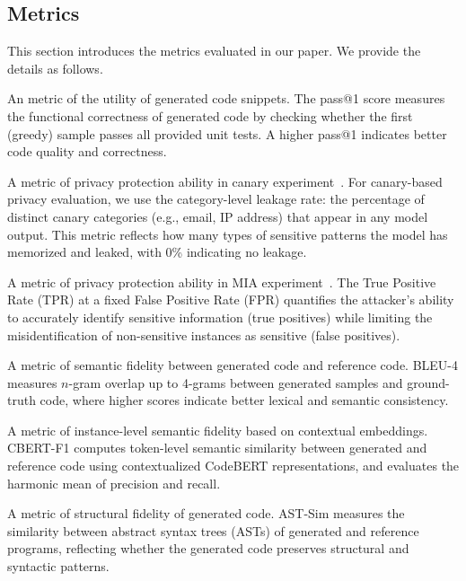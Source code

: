 \documentclass{article}
\theoremstyle{plain}
\theoremstyle{definition}
\theoremstyle{remark}
\begin{document}
{\subsection{Metrics}
\label{app:metrics}

This section introduces the metrics evaluated in our paper. We provide the details as follows.

 An metric of the utility of generated code snippets. The pass@1 score measures the functional correctness of generated code by checking whether the first (greedy) sample passes all provided unit tests. A higher pass@1 indicates better code quality and correctness.

 A metric of privacy protection ability in canary experiment~\cite{yue2023synthetic}. For canary-based privacy evaluation, we use the category-level leakage rate: the percentage of distinct canary categories (e.g., email, IP address) that appear in any model output. This metric reflects how many types of sensitive patterns the model has memorized and leaked, with 0\% indicating no leakage.

 A metric of privacy protection ability in MIA experiment~\cite{li2024privimage, gong2025privorl}. The True Positive Rate (TPR) at a fixed False Positive Rate (FPR) quantifies the attacker’s ability to accurately identify sensitive information (true positives) while limiting the misidentification of non-sensitive instances as sensitive (false positives).

 A metric of semantic fidelity between generated code and reference code. BLEU-4 measures $n$-gram overlap up to 4-grams between generated samples and ground-truth code, where higher scores indicate better lexical and semantic consistency.

 A metric of instance-level semantic fidelity based on contextual embeddings. CBERT-F1 computes token-level semantic similarity between generated and reference code using contextualized CodeBERT representations, and evaluates the harmonic mean of precision and recall.

 A metric of structural fidelity of generated code. AST-Sim measures the similarity between abstract syntax trees (ASTs) of generated and reference programs, reflecting whether the generated code preserves structural and syntactic patterns.

}
\end{document}
